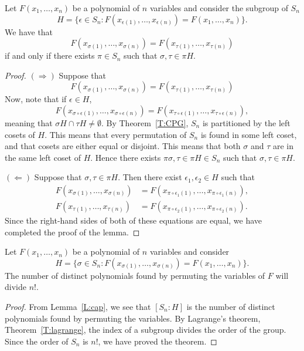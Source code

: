 \documentclass{ximera}
\begin{document}
\begin{lemma}\label{L:cap}
  Let $F(x_1,\dots,x_n)$ be a polynomial of $n$ variables and consider
  the subgroup of $S_n$
  \[
  H = \{\epsilon\in S_n: F(x_{\epsilon(1)},\dots, x_{\epsilon(n)}) = F(x_1,\dots,x_n)\}.
  \]
  We have that 
  \[
  F(x_{\sigma(1)},\dots, x_{\sigma(n)}) = F(x_{\tau(1)},\dots, x_{\tau(n)})
  \]
  if and only if there exists $\pi \in S_n$ such that $\sigma,\tau\in\pi H$.
  \begin{proof}
    $(\Rightarrow)$ Suppose that
    \[
    F(x_{\sigma(1)},\dots, x_{\sigma(n)}) = F(x_{\tau(1)},\dots, x_{\tau(n)})
    \]
    Now, note that if $\epsilon \in H$,
    \[
    F(x_{\sigma\circ\epsilon(1)},\dots, x_{\sigma\circ\epsilon(n)}) =
    F(x_{\tau\circ\epsilon(1)},\dots,
    x_{\tau\circ\epsilon(n)}),
    \]
    meaning that $\sigma H \cap \tau H \ne \emptyset$. By
    Theorem~\ref{T:CPG}, $S_n$ is partitioned by the left cosets of
    $H$. This means that every permutation of $S_n$ is found in some
    left coset, and that cosets are either equal or disjoint. This
    means that both $\sigma$ and $\tau$ are in the same left coset of
    $H$. Hence there exists $\pi \sigma,\tau\in\pi H\in S_n$ such that
    $\sigma,\tau\in\pi H$.

    $(\Leftarrow)$ Suppose that $\sigma,\tau\in \pi H$. Then
    there exist $\epsilon_1,\epsilon_2\in H$ such that
    \begin{align*}
      F(x_{\sigma(1)},\dots, x_{\sigma(n)}) &=
    F(x_{\pi\circ\epsilon_1(1)},\dots,
    x_{\pi\circ\epsilon_1(n)}), \\
      F(x_{\tau(1)},\dots, x_{\tau(n)}) &=
    F(x_{\pi\circ\epsilon_2(1)},\dots,
    x_{\pi\circ\epsilon_2(n)}).
    \end{align*}
    Since the right-hand sides of both of these equations are equal,
    we have completed the proof of the lemma.
  \end{proof}
\end{lemma}

\begin{theorem}
  Let $F(x_1,\dots,x_n)$ be a polynomial of $n$ variables and consider
  \[
  H = \{\sigma\in S_n: F(x_{\sigma(1)},\dots, x_{\sigma(n)}) = F(x_1,\dots,x_n)\}.
  \]
  The number of distinct polynomials found by permuting the
  variables of $F$ will divide $n!$.
    \begin{proof}
      From Lemma~\ref{L:cap}, we see that $[S_n:H]$ is the number of
      distinct polynomials found by permuting the variables. By
      Lagrange's theorem, Theorem~\ref{T:lagrange}, the index of a
      subgroup divides the order of the group. Since the order of
      $S_n$ is $n!$, we have proved the theorem.
      \end{proof}
\end{theorem}
\end{document}
